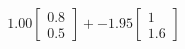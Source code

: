 \documentclass[preview]{standalone}
\begin{document}
\begin{align*}
1.00 \begin{bmatrix} 0.8 \\ 0.5 \end{bmatrix} + -1.95 \begin{bmatrix} 1 \\ 1.6 \end{bmatrix}
\end{align*}
\end{document}
